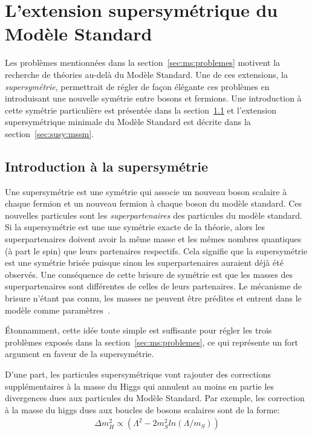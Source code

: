 \singlespacing{}
\chapter{L'extension supersymétrique du Modèle Standard}
\label{sec:susy}
\doublespacing{}

Les problèmes mentionnées dans la section~\ref{sec:ms:problemes}
motivent la recherche de théories au-delà du Modèle Standard. Une de
ces extensions, la \emph{supersymétrie}, permettrait de régler de
façon élégante ces problèmes en introduisant une nouvelle
symétrie entre bosons et fermions. Une introduction à cette symétrie
particulière est présentée dans la section~\ref{sec:susy:th} et
l'extension supersymétrique minimale du Modèle Standard est décrite
dans la section~\ref{sec:susy:mssm}.

\section{Introduction à la supersymétrie}
\label{sec:susy:th}

Une supersymétrie est une symétrie qui associe un nouveau boson
scalaire à chaque fermion et un nouveau fermion à chaque boson du
modèle standard. Ces nouvelles particules sont les
\emph{superpartenaires} des particules du modèle standard. Si la supersymétrie est
une une symétrie exacte de la théorie, alors les superpartenaires
doivent avoir la même masse et les mêmes nombres quantiques (à part le
spin) que leurs partenaires respectifs. Cela signifie que la
supersymétrie est une symétrie brisée puisque sinon les superpartenaires
auraient déjà été observés. Une conséquence de cette
brisure de symétrie est que les masses des superpartenaires sont
différentes de celles de leurs partenaires. Le mécanisme de brisure
n'étant pas connu, les masses ne peuvent être prédites et entrent dans
le modèle comme paramètres~\cite{olive_susy1_2014}.

Étonnamment, cette idée toute simple est suffisante pour régler les
trois problèmes exposés dans la section~\ref{sec:ms:problemes}, ce qui
représente un fort argument en faveur de la supersymétrie. 

D'une part, les particules supersymétrique vont rajouter des
corrections supplémentaires à la masse du Higgs qui annulent au moins
en partie les divergences dues aux particules du Modèle Standard. Par
exemple, les correction à la masse du higgs dues aux boucles de bosons
scalaires sont de la forme:
\begin{eqnarray}
  \Delta m_H^2 \propto 
  \left(
  \Lambda^2 - 2m^2_S ln(\Lambda/m_S)
  \right)
\end{eqnarray}

